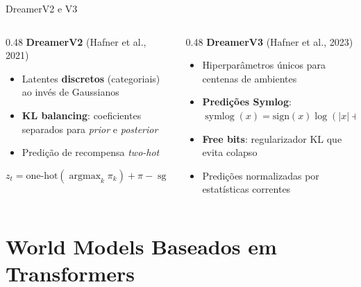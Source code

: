 \documentclass[aspectratio=169]{beamer}
\DeclareMathOperator*{\argmax}{argmax}
\DeclareMathOperator{\sg}{sg}
\DeclareMathOperator{\symlog}{symlog}
\begin{document}
\begin{frame}{DreamerV2 e V3}
  \begin{columns}
    \begin{column}{0.48\textwidth}
      \textbf{DreamerV2} (Hafner et al., 2021)
      \begin{itemize}
        \item Latentes \textbf{discretos} (categoriais) ao invés de Gaussianos
        \item \textbf{KL balancing}: coeficientes separados para \textit{prior} e \textit{posterior}
        \item Predição de recompensa \textit{two-hot}
      \end{itemize}
      \begin{equation}
        z_t = \text{one-hot}(\argmax_k \pi_k) + \pi - \sg(\pi)
      \end{equation}
    \end{column}
    \begin{column}{0.48\textwidth}
      \textbf{DreamerV3} (Hafner et al., 2023)
      \begin{itemize}
        \item Hiperparâmetros únicos para centenas de ambientes
        \item \textbf{Predições Symlog}: $\symlog(x) = \text{sign}(x)\log(|x|+1)$
        \item \textbf{Free bits}: regularizador KL que evita colapso
        \item Predições normalizadas por estatísticas correntes
      \end{itemize}
    \end{column}
  \end{columns}
\end{frame}

\section{World Models Baseados em Transformers}
\end{document}
